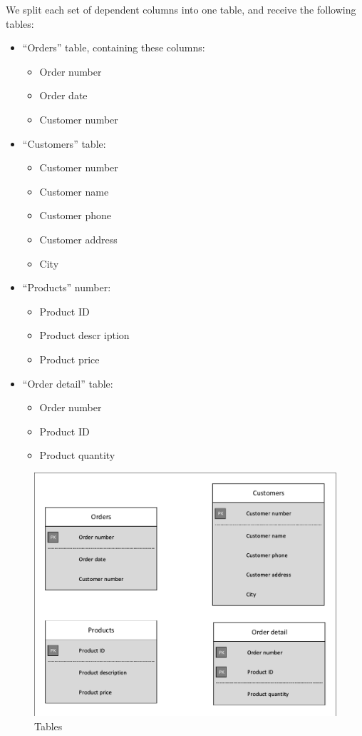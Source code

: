 \documentclass[12pt]{article}
\begin{document}
We split each set of dependent columns into one table, and receive the following tables:
\begin{itemize}
	\item ``Orders'' table, containing these columns:
		\begin{itemize}
			\item Order number
			\item Order date
			\item Customer number
		\end{itemize}
	\item ``Customers'' table:
		\begin{itemize}
			\item Customer number
			\item Customer name
			\item Customer phone
			\item Customer address
			\item City
		\end{itemize}
	\item ``Products'' number:
		\begin{itemize}
			\item Product ID
			\item Product descr	iption
			\item Product price
		\end{itemize}
	\item ``Order detail'' table:
		\begin{itemize}
			\item Order number
			\item Product ID
			\item Product quantity
		\end{itemize}
\end{itemize}

\begin{figure}[h]
    \centering
    \caption{Tables}
    \includegraphics[scale=0.9]{report9_tables.pdf}
\end{figure}

\end{document}
